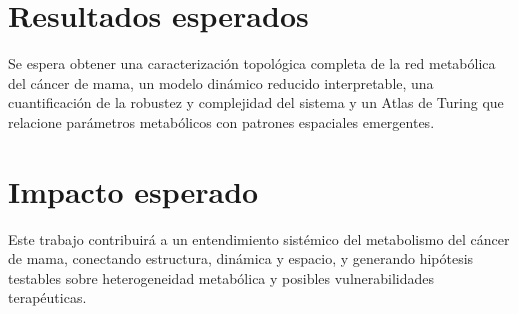 \documentclass[12pt,spanish]{article}
\begin{document}
	\section{Resultados esperados}
	
	Se espera obtener una caracterización topológica completa de la red metabólica del cáncer de mama, un modelo dinámico reducido interpretable, una cuantificación de la robustez y complejidad del sistema y un Atlas de Turing que relacione parámetros metabólicos con patrones espaciales emergentes.
	
	\section{Impacto esperado}
	
	Este trabajo contribuirá a un entendimiento sistémico del metabolismo del cáncer de mama, conectando estructura, dinámica y espacio, y generando hipótesis testables sobre heterogeneidad metabólica y posibles vulnerabilidades terapéuticas.
	
\end{document}
